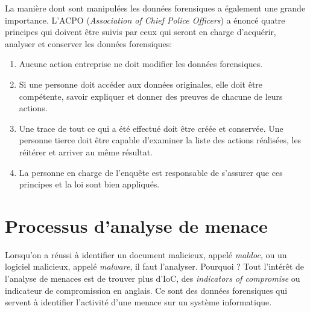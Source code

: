 La manière dont sont manipulées les données forensiques a également une grande importance. L'ACPO (\textit{Association of Chief Police Officers}) a énoncé quatre principes qui doivent être suivis par ceux qui seront en charge d'acquérir, analyser et conserver les données forensiques: \cite{6}
\begin{enumerate}
    \item Aucune action entreprise ne doit modifier les données forensiques.
    \item Si une personne doit accéder aux données originales, elle doit être compétente, savoir expliquer et donner des preuves de chacune de leurs actions.
    \item Une trace de tout ce qui a été effectué doit être créée et conservée. Une personne tierce doit être capable d'examiner la liste des actions réalisées, les réitérer et arriver au même résultat.
    \item La personne en charge de l'enquête est responsable de s'assurer que ces principes et la loi sont bien appliqués.
\end{enumerate}





\section{Processus d'analyse de menace}

Lorsqu'on a réussi à identifier un document malicieux, appelé \textit{maldoc}, ou un logiciel malicieux, appelé \textit{malware}, il faut l'analyser. Pourquoi ? Tout l'intérêt de l'analyse de menaces est de trouver plus d'IoC, des \textit{indicators of compromise} ou indicateur de compromission en anglais. Ce sont des données forensiques qui servent à identifier l'activité d'une menace sur un système informatique.

